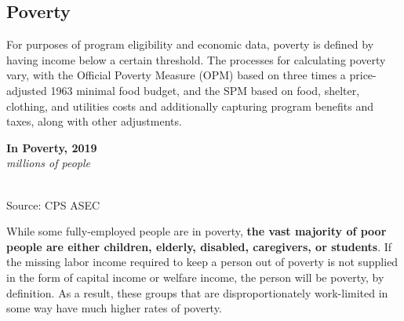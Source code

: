 \documentclass{report}
\newcommand{\barylab}[2]{yticklabel style={text width=#1, align=right, 
		style={black!70}, text height=#2},}
\newcommand{\bbar}[2]{extra #1 ticks = {{#2}}, extra #1 tick labels = ,
		extra #1 tick style = {grid=major, grid style={thick, black!25}},}
\newcommand{\barplotnogrid}{xbar=0pt, axis line style={draw=none},
	    yticklabel style={align=left, anchor=east},
      		xmajorticks=false, ymajorgrids=false,   
	    ytick=data, tickwidth=0pt, area legend, reverse legend,
	    nodes near coords, nodes near coords align={horizontal},}
\begin{document}
{\subsection*{\color{black!70} \seriffont Poverty}
\begin{minipage}{0.76\textwidth}
\small 

For purposes of program eligibility and economic data, poverty is defined by having income below a certain threshold. The processes for calculating poverty vary, with the Official Poverty Measure (OPM) based on three times a price-adjusted 1963 minimal food budget, and the SPM based on food, shelter, clothing, and utilities costs and additionally capturing program benefits and taxes, along with other adjustments.
\end{minipage} \hspace{6mm}
\begin{minipage}{0.24\textwidth}
\normalsize \textbf{In Poverty, 2019}\\
\footnotesize{\textit{millions of people}}\\
  \hspace*{-4mm} \\
\footnotesize{Source: CPS ASEC}
\vfill
\end{minipage}
\vspace{1mm}

\begin{minipage}{0.76\textwidth}
\small While some fully-employed people are in poverty, \textbf{the vast majority of poor people are either children, elderly, disabled, caregivers, or students}.  If the missing labor income required to keep a person out of poverty is not supplied in the form of capital income or welfare income, the person will be poverty, by definition. As a result, these groups that are disproportionately work-limited in some way have much higher rates of poverty. 
\vspace{1mm}


\end{minipage}}
\end{document}
